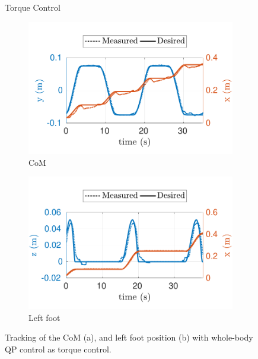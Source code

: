 \begin{figure}[t]
    \begin{myframe}{Torque Control}
        \begin{subfigure}[b]{0.49\textwidth}
        \centering
        \includegraphics[width=\textwidth]{chapter_wbc_benchmarking/figures/torq-real-com.pdf}
        \caption{CoM}
        \label{fig:torq-real-com}
    \end{subfigure}
    \hfill
     \begin{subfigure}[b]{0.49\textwidth}
        \centering
        \includegraphics[width=\textwidth]{chapter_wbc_benchmarking/figures/torq-real-lf.pdf}
        \caption{Left foot}
        \label{fig:torq-real-lf}
    \end{subfigure}
    \end{myframe}
    \caption{Tracking of the CoM (a), and left foot position (b) with whole-body QP control as torque control.}
\end{figure}


